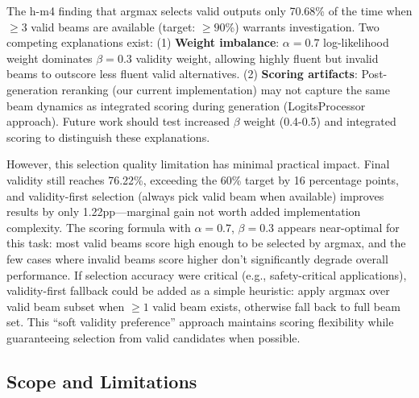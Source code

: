 The h-m4 finding that argmax selects valid outputs only 70.68\% of the time when $\geq 3$ valid beams are available (target: $\geq 90$\%) warrants investigation. Two competing explanations exist: (1) \textbf{Weight imbalance}: $\alpha=0.7$ log-likelihood weight dominates $\beta=0.3$ validity weight, allowing highly fluent but invalid beams to outscore less fluent valid alternatives. (2) \textbf{Scoring artifacts}: Post-generation reranking (our current implementation) may not capture the same beam dynamics as integrated scoring during generation (LogitsProcessor approach). Future work should test increased $\beta$ weight (0.4-0.5) and integrated scoring to distinguish these explanations.

However, this selection quality limitation has minimal practical impact. Final validity still reaches 76.22\%, exceeding the 60\% target by 16 percentage points, and validity-first selection (always pick valid beam when available) improves results by only 1.22pp---marginal gain not worth added implementation complexity. The scoring formula with $\alpha=0.7$, $\beta=0.3$ appears near-optimal for this task: most valid beams score high enough to be selected by argmax, and the few cases where invalid beams score higher don't significantly degrade overall performance. If selection accuracy were critical (e.g., safety-critical applications), validity-first fallback could be added as a simple heuristic: apply argmax over valid beam subset when $\geq 1$ valid beam exists, otherwise fall back to full beam set. This ``soft validity preference'' approach maintains scoring flexibility while guaranteeing selection from valid candidates when possible.

\subsection{Scope and Limitations}

